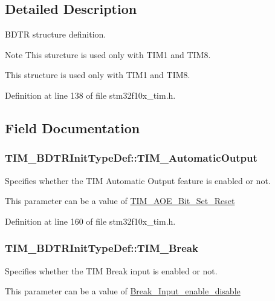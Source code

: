 \subsection{Detailed Description}
B\-D\-T\-R structure definition. 

\begin{DoxyNote}{Note}
This sturcture is used only with T\-I\-M1 and T\-I\-M8.

This structure is used only with T\-I\-M1 and T\-I\-M8. 
\end{DoxyNote}


Definition at line 138 of file stm32f10x\-\_\-tim.\-h.



\subsection{Field Documentation}
\hypertarget{struct_t_i_m___b_d_t_r_init_type_def_a6c056e29af67fd8a32919104ea48eea2}{
\subsubsection[{T\-I\-M\-\_\-\-Automatic\-Output}]{ T\-I\-M\-\_\-\-B\-D\-T\-R\-Init\-Type\-Def\-::\-T\-I\-M\-\_\-\-Automatic\-Output}}\label{struct_t_i_m___b_d_t_r_init_type_def_a6c056e29af67fd8a32919104ea48eea2}
\begin{DoxyVerb}  Specifies whether the TIM Automatic Output feature is enabled or not. 
\end{DoxyVerb}
 This parameter can be a value of \hyperlink{group___t_i_m___a_o_e___bit___set___reset}{T\-I\-M\-\_\-\-A\-O\-E\-\_\-\-Bit\-\_\-\-Set\-\_\-\-Reset} 

Definition at line 160 of file stm32f10x\-\_\-tim.\-h.

\hypertarget{struct_t_i_m___b_d_t_r_init_type_def_a9fcf20632d0377727476a98f7183be56}{
\subsubsection[{T\-I\-M\-\_\-\-Break}]{ T\-I\-M\-\_\-\-B\-D\-T\-R\-Init\-Type\-Def\-::\-T\-I\-M\-\_\-\-Break}}\label{struct_t_i_m___b_d_t_r_init_type_def_a9fcf20632d0377727476a98f7183be56}
\begin{DoxyVerb}            Specifies whether the TIM Break input is enabled or not. 
\end{DoxyVerb}
 This parameter can be a value of \hyperlink{group___break___input__enable__disable}{Break\-\_\-\-Input\-\_\-enable\-\_\-disable}

